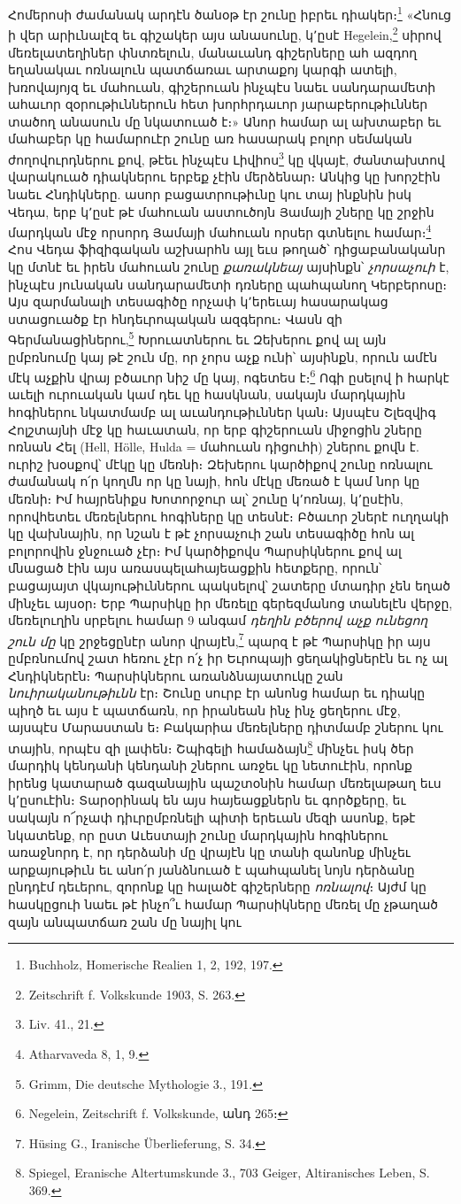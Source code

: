 \documentclass{article}
\begin{document}
{Հոմերոսի ժամանակ արդէն ծանօթ էր շունը իբրեւ դիակեր։\footnote{Buchholz, Homerische Realien 1, 2, 192, 197.} «Հնուց ի վեր արիւնալէզ եւ գիշակեր այս անասունը, կ՚ըսէ Hegelein,\footnote{Zeitschrift f. Volkskunde 1903, S. 263.} սիրով մեռելատեղիներ փնտռելուն, մանաւանդ գիշերները ահ ազդող եղանակաւ ոռնալուն պատճառաւ արտաքոյ կարգի ատելի, խռովայոյզ եւ մահուան, գիշերուան ինչպէս նաեւ սանդարամետի ահաւոր զօրութիւններուն հետ խորհրդաւոր յարաբերութիւններ տածող անասուն մը նկատուած է։» Անոր համար ալ ախտաբեր եւ մահաբեր կը համարուէր շունը առ հասարակ բոլոր սեմական ժողովուրդներու քով, թէեւ ինչպէս Լիվիոս\footnote{Liv. 41., 21.} կը վկայէ, ժանտախտով վարակուած դիակներու երբեք չէին մերձենար։ Անկից կը խորշէին նաեւ Հնդիկները. ասոր բացատրութիւնը կու տայ ինքնին իսկ Վեդա, երբ կ՚ըսէ թէ մահուան աստուծոյն Յամայի շները կը շրջին մարդկան մէջ որսորդ Յամայի մահուան որսեր գտնելու համար։\footnote{Atharvaveda 8, 1, 9.} Հոս Վեդա ֆիզիգական աշխարհն այլ եւս թողած՝ դիցաբանականր կը մտնէ եւ իրեն մահուան շունը \emph{քառակնեայ} այսինքն՝ \emph{չորսաչուի} է, ինչպէս յունական սանդարամետի դռները պահպանող Կերբերոսը։ Այս զարմանալի տեսագիծը որչափ կ՚երեւայ հասարակաց ստացուածք էր հնդեւրոպական ազգերու։ Վասն զի Գերմանացիներու,\footnote{Grimm, Die deutsche Mythologie 3., 191.} Խրուատներու եւ Զեխերու քով ալ այն ըմբռնումը կայ թէ շուն մը, որ չորս աչք ունի՝ այսինքն, որուն ամէն մէկ աչքին վրայ բծաւոր նիշ մը կայ, ոգետես է։\footnote{Negelein, Zeitschrift f. Volkskunde, անդ 265։} Ոգի ըսելով ի հարկէ աւելի ուրուական կամ դեւ կը հասկնան, սակայն մարդկային հոգիներու նկատմամբ ալ աւանդութիւններ կան։ Այսպէս Շլեզվիգ Հոլշտայնի մէջ կը հաւատան, որ երբ գիշերուան միջոցին շները ոռնան Հել (Hell, Hölle, Hulda = մահուան դիցուհի) շներու քովն է. ուրիշ խօսքով՝ մէկը կը մեռնի։ Զեխերու կարծիքով շունը ոռնալու ժամանակ ո՛ր կողմն որ կը նայի, հոն մէկը մեռած է կամ նոր կը մեռնի։ Իմ հայրենիքս Խոտորջուր ալ՝ շունը կ՚ոռնայ, կ՚ըսէին, որովհետեւ մեռելներու հոգիները կը տեսնէ։ Բծաւոր շներէ ուղղակի կը վախնային, որ նշան է թէ չորսաչուի շան տեսագիծը հոն ալ բոլորովին ջնջուած չէր։ Իմ կարծիքովս Պարսիկներու քով ալ մնացած էին այս առասպելահայեացքին հետքերը, որուն՝ բացայայտ վկայութիւններու պակսելով՝ շատերը մտադիր չեն եղած մինչեւ այսօր։ Երբ Պարսիկը իր մեռելը գերեզմանոց տանելէն վերջը, մեռելուղին սրբելու համար 9 անգամ \emph{դեղին բծերով աչք ունեցող շուն մը} կը շրջեցընէր անոր վրայէն,\footnote{Hüsing G., Iranische Überlieferung, S. 34.} պարզ է թէ Պարսիկը իր այս ըմբռնումով շատ հեռու չէր ո՛չ իր Եւրոպայի ցեղակիցներէն եւ ոչ ալ Հնդիկներէն։ Պարսիկներու առանձնայատուկը շան \emph{նուիրականութիւնն} էր։ Շունը սուրբ էր անոնց համար եւ դիակը պիղծ եւ այս է պատճառն, որ իրանեան ինչ ինչ ցեղերու մէջ, այսպէս Մարաստան ե։ Բակարիա մեռելները դիտմամբ շներու կու տային, որպէս զի լափեն։ Շպիգելի համաձայն\footnote{Spiegel, Eranische Altertumskunde 3., 703 Geiger, Altiranisches Leben, S. 369.} մինչեւ իսկ ծեր մարդիկ կենդանի կենդանի շներու առջեւ կը նետուէին, որոնք իրենց կատարած գազանային պաշտօնին համար մեռելաթաղ եւս կ՚ըսուէին։ Տարօրինակ են այս հայեացքներն եւ գործքերը, եւ սակայն ո՜րչափ դիւրըմբռնելի պիտի երեւան մեզի ասոնք, եթէ նկատենք, որ ըստ Աւեստայի շունը մարդկային հոգիներու առաջնորդ է, որ դերձանի մը վրայէն կը տանի զանոնք մինչեւ արքայութիւն եւ անո՛ր յանձնուած է պահպանել նոյն դերձանը ընդդէմ դեւերու, զորոնք կը հալածէ գիշերները \emph{ոռնալով}։ Այժմ կը հասկըցուի նաեւ թէ ինչո՞ւ համար Պարսիկները մեռել մը չթաղած զայն անպատճառ շան մը նայիլ կու }
\end{document}

